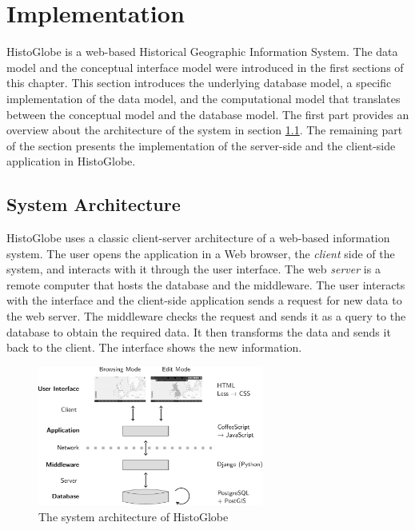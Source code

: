 
\section{Implementation} %
\label{sec:implementation}

HistoGlobe is a web-based Historical Geographic Information System. The data model and the conceptual interface model were introduced in the first sections of this chapter. This section introduces the underlying database model, a specific implementation of the data model, and the computational model that translates between the conceptual model and the database model. The first part provides an overview about the architecture of the system in section \ref{sub:system_architecture}. The remaining part of the section presents the implementation of the server-side and the client-side application in HistoGlobe.

\subsection{System Architecture} %
\label{sub:system_architecture}

HistoGlobe uses a classic client-server architecture of a web-based information system. The user opens the application in a Web browser, the \emph{client} side of the system, and interacts with it through the user interface. The web \emph{server} is a remote computer that hosts the database and the middleware. The user interacts with the interface and the client-side application sends a request for new data to the web server. The middleware checks the request and sends it as a query to the database to obtain the required data. It then transforms the data and sends it back to the client. The interface shows the new information.

\begin{figure}[H]
  \vspace{1em}
  \centering
  \includegraphics[width=0.66\textwidth]{graphics/development/implementation/system_architecture}
  \caption{The system architecture of HistoGlobe}
  \label{fig:system_architecture}
\end{figure}

